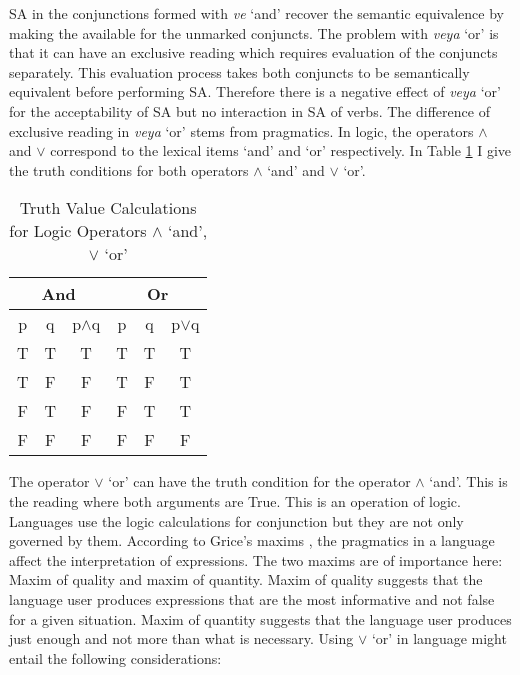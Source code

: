 SA in the conjunctions formed with \textit{ve} `and' recover the semantic equivalence by making the {\Case} available for the unmarked conjuncts. The problem with \textit{veya} `or' is that it can have an exclusive reading which requires evaluation of the conjuncts separately. This evaluation process takes both conjuncts to be semantically equivalent before performing SA. Therefore there is a negative effect of \textit{veya} `or' for the acceptability of {\Case} SA but no interaction in SA of verbs. The difference of exclusive reading in \textit{veya} `or' stems from pragmatics. In logic, the operators $\wedge$ and $\vee$ correspond to the lexical items `and' and `or' respectively. In Table \ref{tab:operators} I give the truth conditions for both operators $\wedge$ `and' and $\vee$ `or'.

\begin{table}[hbt!]
    \centering
    \begin{tabular}{|cc|c|cc|c|}
    \hline
        \multicolumn{3}{|c|}{And} & \multicolumn{3}{|c|}{Or} \\ \hline
        p & q & p$\wedge$q & p & q & p$\vee$q \\ \hline
        T & T & T & T & T & T \\
        T & F & F & T & F & T \\
        F & T & F & F & T & T \\
        F & F & F & F & F & F \\
    \hline    
    \end{tabular}
    \caption{Truth Value Calculations for Logic Operators $\wedge$ `and', $\vee$ `or'}
    \label{tab:operators}
\end{table}

The operator $\vee$ `or' can have the truth condition for the operator $\wedge$ `and'. This is the reading where both arguments are True. This is an operation of logic. Languages use the logic calculations for conjunction but they are not only governed by them. According to Grice's maxims \citep{grice1989studies}, the pragmatics in a language affect the interpretation of expressions. The two maxims are of importance here: Maxim of quality and maxim of quantity. Maxim of quality suggests that the language user produces expressions that are the most informative and not false for a given situation. Maxim of quantity suggests that the language user produces just enough and not more than what is necessary. Using $\vee$ `or' in language might entail the following considerations:

